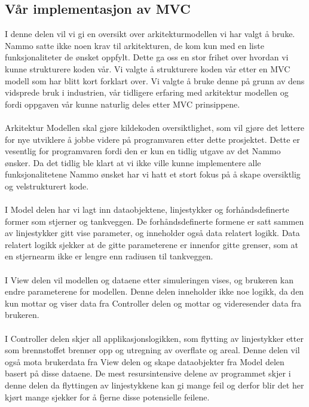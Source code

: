 \subsection{Vår implementasjon av MVC}
I denne delen vil vi gi en oversikt over arkitekturmodellen vi har valgt å bruke. Nammo satte ikke noen krav til arkitekturen, de kom kun med en liste funksjonaliteter de ønsket oppfylt. Dette ga oss en stor frihet over hvordan vi kunne strukturere koden vår. Vi valgte å strukturere koden vår etter en MVC modell som har blitt kort forklart over. Vi valgte å bruke denne på grunn av dens vidsprede bruk i industrien, vår tidligere erfaring med arkitektur modellen og fordi oppgaven vår kunne naturlig deles etter MVC prinsippene. \\ \\
Arkitektur Modellen skal gjøre kildekoden oversiktlighet, som vil gjøre det lettere for nye utviklere å jobbe videre på programvaren etter dette prosjektet. Dette er vesentlig for programvaren fordi den er kun en tidlig utgave av det Nammo ønsker. Da det tidlig ble klart at vi ikke ville kunne implementere alle funksjonalitetene Nammo ønsket har vi hatt et stort fokus på å skape oversiktlig og velstrukturert kode. \\ \\
I Model delen har vi lagt inn dataobjektene, linjestykker og forhåndsdefinerte former som stjerner og tankveggen. De forhåndsdefinerte formene er satt sammen av linjestykker gitt vise parameter, og inneholder også data relatert logikk. Data relatert logikk sjekker at de gitte parameterene er innenfor gitte grenser, som at en stjernearm ikke er lengre enn radiusen til tankveggen.\\ \\
I View delen vil modellen og dataene etter simuleringen vises, og brukeren kan endre parameterene for modellen. Denne delen inneholder ikke noe logikk, da den kun mottar og viser data fra Controller delen og mottar og videresender data fra brukeren.\\ \\
I Controller delen skjer all applikasjonslogikken, som flytting av linjestykker etter som brennstoffet brenner opp og utregning av overflate og areal. Denne delen vil også mota brukerdata fra View delen og skape dataobjekter fra Model delen basert på disse dataene. De mest resursintensive delene av programmet skjer i denne delen da flyttingen av linjestykkene kan gi mange feil og derfor blir det her kjørt mange sjekker for å fjerne disse potensielle feilene.

